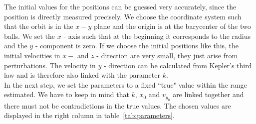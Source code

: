 \documentclass[prb,preprint]{revtex4-1}
\begin{document}
The initial values for the positions can be guessed very accurately, since the position is directly measured precisely. We choose the coordinate system such that the orbit is in the $x-y$ plane and the origin is at the barycenter of the two balls. We set the $x$ - axis such that at the beginning it corresponds to the radius and the $y$ - component is zero.
If we choose the initial positions like this, the initial velocities in $x-$ and $z$ - direction are very small, they just arise from perturbations. The velocity in $y$ - direction can be calculated from Kepler's third law and is therefore also linked with the parameter $k$.\\

In the next step, we set the parameters to a fixed ``true" value within the range estimated. We have to keep in mind that $k$, $x_0$ and $v_{y_0}$ are linked together and there must not be contradictions in the true values. The chosen values are displayed in the right column in table~\ref{tab:parameters}.\\
\end{document}
